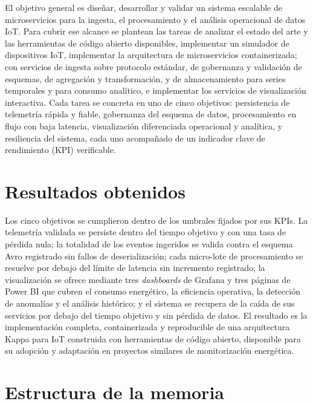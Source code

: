 El objetivo general es diseñar, desarrollar y validar un sistema escalable de microservicios para la ingesta, el procesamiento y el análisis operacional de datos IoT. Para cubrir ese alcance se plantean las tareas de analizar el estado del arte y las herramientas de código abierto disponibles, implementar un simulador de dispositivos IoT, implementar la arquitectura de microservicios containerizada; con servicios de ingesta sobre protocolo estándar, de gobernanza y validación de esquemas, de agregación y transformación, y de almacenamiento para series temporales y para consumo analítico, e implementar los servicios de visualización interactiva. Cada tarea se concreta en uno de cinco objetivos: persistencia de telemetría rápida y fiable, gobernanza del esquema de datos, procesamiento en flujo con baja latencia, visualización diferenciada operacional y analítica, y resiliencia del sistema, cada uno acompañado de un indicador clave de rendimiento (KPI) verificable.

\section{Resultados obtenidos}

Los cinco objetivos se cumplieron dentro de los umbrales fijados por sus KPIs. La telemetría validada se persiste dentro del tiempo objetivo y con una tasa de pérdida nula; la totalidad de los eventos ingeridos se valida contra el esquema Avro registrado sin fallos de deserialización; cada micro-lote de procesamiento se resuelve por debajo del límite de latencia sin incremento registrado; la visualización se ofrece mediante tres \textit{dashboards} de Grafana y tres páginas de Power BI que cubren el consumo energético, la eficiencia operativa, la detección de anomalías y el análisis histórico; y el sistema se recupera de la caída de sus servicios por debajo del tiempo objetivo y sin pérdida de datos. El resultado es la implementación completa, containerizada y reproducible de una arquitectura Kappa para IoT construida con herramientas de código abierto, disponible para su adopción y adaptación en proyectos similares de monitorización energética.

\section{Estructura de la memoria}

